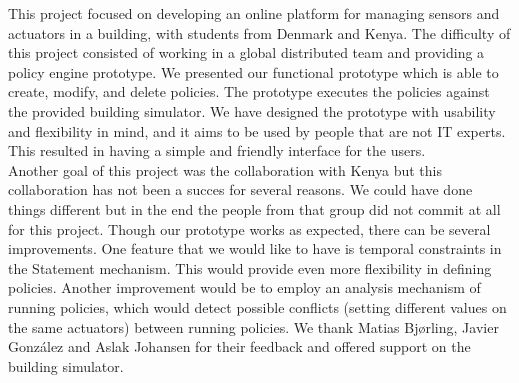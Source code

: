 This project focused on developing an online platform for managing sensors and actuators in a building, with students from Denmark and Kenya. The difficulty of this project consisted of working in a global distributed team and providing a policy engine prototype. We presented our functional prototype which is able to create, modify, and delete policies. The prototype executes the policies against the provided building simulator. We have designed the prototype with usability and flexibility in mind, and it aims to be used by people that are not IT experts. This resulted in having a simple and friendly interface for the users. 
\\Another goal of this project was the collaboration with Kenya but this collaboration has not been a succes for several reasons. We could have done things different but in the end the people from that group did not commit at all for this project. 
Though our prototype works as expected, there can be several improvements. One feature that we would like to have is temporal constraints in the Statement mechanism. This would provide even more flexibility in defining policies. Another improvement would be to employ an analysis mechanism of running policies, which would detect possible conflicts (setting different values on the same actuators) between running policies.
We thank Matias Bjørling, Javier González and Aslak Johansen for their feedback and offered support on the building simulator. 

